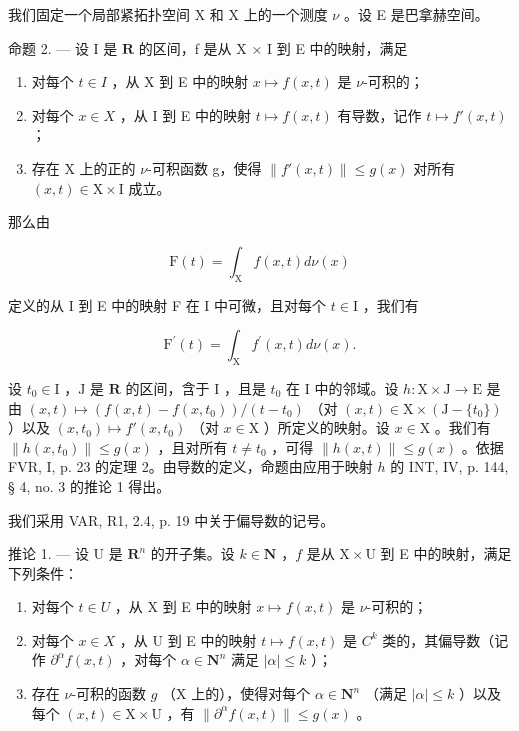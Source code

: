 我们固定一个局部紧拓扑空间 X 和 X 上的一个测度 \(\nu\) 。设 E 是巴拿赫空间。

命题 2. --- 设 I 是 \(\mathbf{R}\) 的区间，f 是从 X × I 到 E 中的映射，满足

\begin{enumerate}
\def\labelenumi{(\roman{enumi})}
\item
  对每个 \(t \in I\) ，从 X 到 E 中的映射 \(x \mapsto f(x, t)\) 是 \(\nu\)-可积的；
\item
  对每个 \(x \in X\) ，从 I 到 E 中的映射 \(t \mapsto f(x, t)\) 有导数，记作 \(t \mapsto f'(x, t)\) ；
\item
  存在 X 上的正的 \(\nu\)-可积函数 g，使得 \(\|f'(x,t)\| \leqslant g(x)\) 对所有 \((x,t) \in \mathrm{X} \times \mathrm{I}\) 成立。
\end{enumerate}

那么由

\[
\mathrm{F} (t) = \int_ {\mathrm{X}} f (x, t) d \nu (x)
\]

定义的从 I 到 E 中的映射 F 在 I 中可微，且对每个 \(t \in \mathrm{I}\) ，我们有

\[
\mathrm{F} ^ {\prime} (t) = \int_ {\mathrm{X}} f ^ {\prime} (x, t) d \nu (x).
\]

设 \(t_0 \in \mathrm{I}\) ，\(\mathrm{J}\) 是 \(\mathbf{R}\) 的区间，含于 \(\mathrm{I}\) ，且是 \(t_0\) 在 \(\mathrm{I}\) 中的邻域。设 \(h: \mathrm{X} \times \mathrm{J} \to \mathrm{E}\) 是由 \((x, t) \mapsto (f(x, t) - f(x, t_0)) / (t - t_0)\) （对 \((x, t) \in \mathrm{X} \times (\mathrm{J} - \{t_0\})\) ）以及 \((x, t_0) \mapsto f'(x, t_0)\) （对 \(x \in \mathrm{X}\) ）所定义的映射。设 \(x \in \mathrm{X}\) 。我们有 \(\|h(x, t_0)\| \leqslant g(x)\) ，且对所有 \(t \neq t_0\) ，可得 \(\|h(x, t)\| \leqslant g(x)\) 。依据 FVR, I, p. 23 的定理 2。由导数的定义，命题由应用于映射 \(h\) 的 INT, IV, p. 144, § 4, no. 3 的推论 1 得出。

我们采用 VAR, R1, 2.4, p. 19 中关于偏导数的记号。

推论 1. --- 设 U 是 \(\mathbf{R}^{n}\) 的开子集。设 \(k \in \mathbf{N}\) ，\(f\) 是从 \(\mathrm{X} \times \mathrm{U}\) 到 E 中的映射，满足下列条件：

\begin{enumerate}
\def\labelenumi{(\roman{enumi})}
\item
  对每个 \(t \in U\) ，从 X 到 E 中的映射 \(x \mapsto f(x, t)\) 是 \(\nu\)-可积的；
\item
  对每个 \(x \in X\) ，从 U 到 E 中的映射 \(t \mapsto f(x, t)\) 是 \(C^{k}\) 类的，其偏导数（记作 \(\partial^{\alpha}f(x, t)\) ，对每个 \(\alpha \in \mathbf{N}^{n}\) 满足 \(|\alpha| \leqslant k\) ）；
\item
  存在 \(\nu\)-可积的函数 \(g\) （X 上的），使得对每个 \(\alpha \in \mathbf{N}^n\) （满足 \(|\alpha| \leqslant k\) ）以及每个 \((x,t) \in \mathrm{X} \times \mathrm{U}\) ，有 \(\|\partial^\alpha f(x,t)\| \leqslant g(x)\) 。
\end{enumerate}

